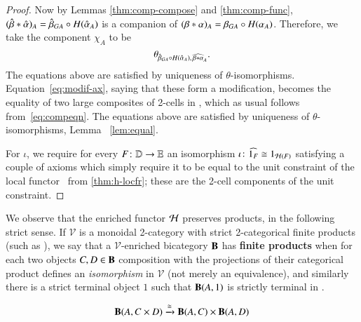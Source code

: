 \begin{proof}
  Now by Lemmas \ref{thm:comp-compose} and
  \ref{thm:comp-func}, $(\hat{\beta} *\hat{\alpha})_A = \hat{\beta}_{GA} \circ
  H(\hat{\alpha}_A)$ is a companion of $(\beta*\alpha)_A = \beta_{GA} \circ
  H(\alpha_A)$.  Therefore, we take the component $\chi_A$ to be
  \[\theta_{\hat{\beta}_{GA} \circ H(\hat{\alpha}_A),\, \widehat{\beta*\alpha}_A}.\]
  The equations above are satisfied by uniqueness of $\theta$-isomorphisms.
   Equation~\eqref{eq:modif-ax}, saying that these form a modification,
  becomes the equality of two large composites of 2-cells in \lD,
  which as usual follows from~\eqref{eq:compeqn}. The equations above are satisfied by uniqueness of $\theta$-isomorphisms, Lemma ~\ref{lem:equal}.

  For $\iota$, we require for every $F\colon \mathbb{D}\to\mathbb{E}$ an isomorphism  $\iota\colon \widehat{1_F} \cong 1_{\mathcal{H}(F)}$ satisfying a couple of
  axioms which simply require it to be equal to the unit constraint of
  the local functor \cH\ from \autoref{thm:h-locfr}; these are the
  2-cell components of the unit constraint.  %
\end{proof}

We observe that the enriched functor $\mathcal{H}$ preserves products, in the following strict sense.
If $\mathcal{V}$ is a monoidal 2-category with strict 2-categorical finite products (such as \Icon), we say that a $\mathcal{V}$-enriched bicategory ${\bf B}$ has \textbf{finite products} when for each two objects $C,D \in {\bf B}$ composition with the projections of their categorical product defines an \emph{isomorphism} in $\mathcal{V}$ (not merely an equivalence), and similarly there is a strict terminal object $1$ such that $\mathbf{B}(A,1)$ is strictly terminal in \cV.

\begin{align}
{\bf B}(A, C \times D) \xrightarrow{\cong} {\bf B}(A,C) \times {\bf B}(A,D)
\end{align}

